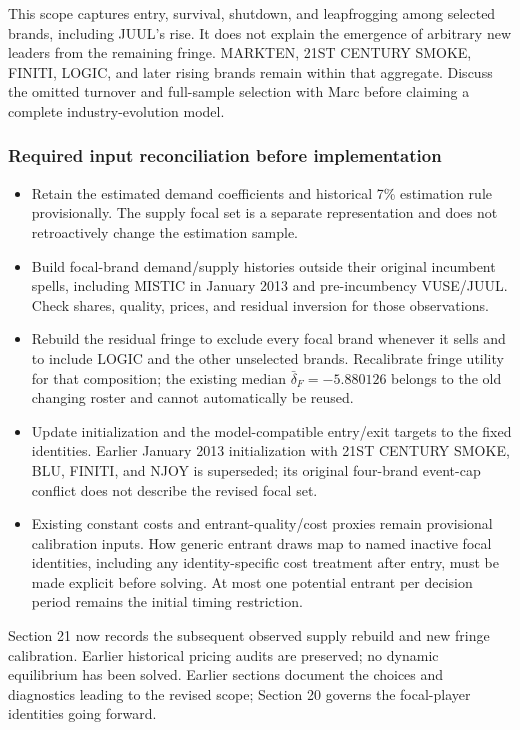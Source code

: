 \documentclass[10pt,]{article}
\providecommand{\tightlist}{%
  \setlength{\itemsep}{0pt}\setlength{\parskip}{0pt}}
\begin{document}
This scope captures entry, survival, shutdown, and leapfrogging among
selected brands, including JUUL's rise. It does not explain the
emergence of arbitrary new leaders from the remaining fringe. MARKTEN,
21ST CENTURY SMOKE, FINITI, LOGIC, and later rising brands remain within
that aggregate. Discuss the omitted turnover and full-sample selection
with Marc before claiming a complete industry-evolution model.

\subsubsection{Required input reconciliation before
implementation}\label{required-input-reconciliation-before-implementation}

\begin{itemize}
\tightlist
\item
  Retain the estimated demand coefficients and historical 7\% estimation
  rule provisionally. The supply focal set is a separate representation
  and does not retroactively change the estimation sample.
\item
  Build focal-brand demand/supply histories outside their original
  incumbent spells, including MISTIC in January 2013 and pre-incumbency
  VUSE/JUUL. Check shares, quality, prices, and residual inversion for
  those observations.
\item
  Rebuild the residual fringe to exclude every focal brand whenever it
  sells and to include LOGIC and the other unselected brands.
  Recalibrate fringe utility for that composition; the existing median
  \(\bar\delta_F=-5.880126\) belongs to the old changing roster and
  cannot automatically be reused.
\item
  Update initialization and the model-compatible entry/exit targets to
  the fixed identities. Earlier January 2013 initialization with 21ST
  CENTURY SMOKE, BLU, FINITI, and NJOY is superseded; its original
  four-brand event-cap conflict does not describe the revised focal set.
\item
  Existing constant costs and entrant-quality/cost proxies remain
  provisional calibration inputs. How generic entrant draws map to named
  inactive focal identities, including any identity-specific cost
  treatment after entry, must be made explicit before solving. At most
  one potential entrant per decision period remains the initial timing
  restriction.
\end{itemize}

Section 21 now records the subsequent observed supply rebuild and new
fringe calibration. Earlier historical pricing audits are preserved; no
dynamic equilibrium has been solved. Earlier sections document the
choices and diagnostics leading to the revised scope; Section 20 governs
the focal-player identities going forward.
\end{document}
